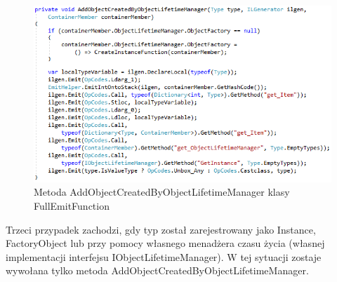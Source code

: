 \documentclass[12pt]{article}
\begin{document}
\begin{figure}[h]
	\begin{center}
  		\includegraphics{FullEmitFunction_AddObjectCreatedByObjectLifetimeManager.png}
  		\caption{Metoda AddObjectCreatedByObjectLifetimeManager klasy FullEmitFunction}
  		\label{fig:FullEmitFunction_AddObjectCreatedByObjectLifetimeManager}
	\end{center}
\end{figure}

Trzeci przypadek zachodzi, gdy typ został zarejestrowany jako Instance, FactoryObject lub przy pomocy własnego menadżera czasu życia (własnej implementacji interfejsu IObjectLifetimeManager). W tej sytuacji zostaje wywołana tylko metoda AddObjectCreatedByObjectLifetimeManager.
\end{document}
